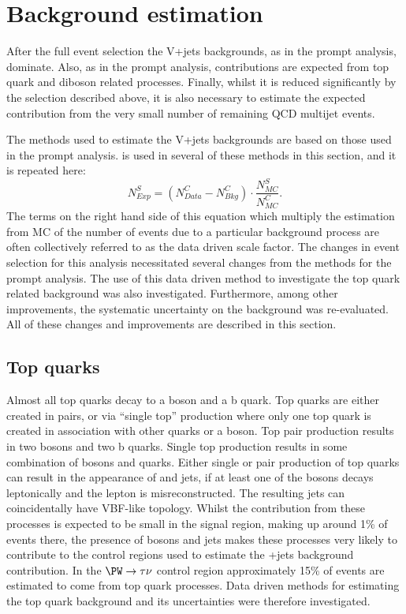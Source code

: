 \section{Background estimation}                                                                                                                          
\label{sec:parkedbkg}
After the full event selection the V+jets backgrounds, as in the prompt analysis, dominate. Also, as in the prompt analysis, contributions are expected from top quark and diboson related processes. Finally, whilst it is reduced significantly by the selection described above, it is also necessary to estimate the expected contribution from the very small number of remaining \ac{QCD} multijet events.

The methods used to estimate the V+jets backgrounds are based on those used in the prompt analysis.  is used in several of these methods in this section, and it is repeated here:
\begin{equation}
  \label{eq:wdatabkgrep}
  N^{S}_{Exp}=\left(N^{C}_{Data}-N^{C}_{Bkg}\right)\cdot\frac{N^{S}_{MC}}{N^{C}_{MC}}.
\end{equation}
The terms on the right hand side of this equation which multiply the estimation from \ac{MC} of the number of events due to a particular background process are often collectively referred to as the data driven scale factor. The changes in event selection for this analysis necessitated several changes from the methods for the prompt analysis. The use of this data driven method to investigate the top quark related background was also investigated. Furthermore, among other improvements, the systematic uncertainty on the \Znunu background was re-evaluated. All of these changes and improvements are described in this section.

\subsection{Top quarks}
\label{sec:parkedtop}
Almost all top quarks decay to a \PW boson and a b quark. Top quarks are either created in pairs, or via ``single top'' production where only one top quark is created in association with  other quarks or a \PW boson. Top pair production results in two \PW bosons and two b quarks. Single top production results in some combination of \PW bosons and quarks. Either single or pair production of top quarks can result in the appearance of \MET and jets, if at least one of the \PW bosons decays leptonically and the lepton is misreconstructed. The resulting jets can coincidentally have \ac{VBF}-like topology. Whilst the contribution from these processes is expected to be small in the signal region, making up around 1\% of events there, the presence of \PW bosons and jets makes these processes very likely to contribute to the control regions used to estimate the \PW+jets background contribution. In the $\PW\rightarrow\tau\nu$ control region approximately 15\% of events are estimated to come from top quark processes. Data driven methods for estimating the top quark background and its uncertainties were therefore investigated.


